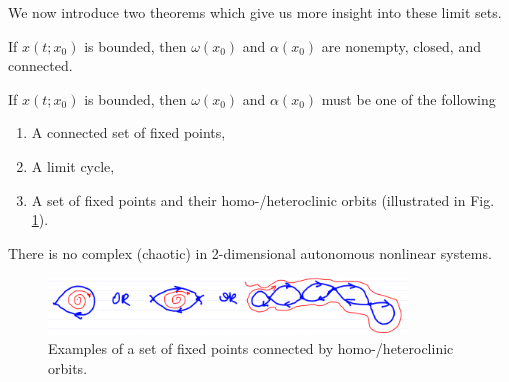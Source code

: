 We now introduce two theorems which give us more insight into these limit sets.
\begin{theorem}[]
	If $x(t;x_0)$ is bounded, then $\omega(x_0)$ and $\alpha(x_0)$ are nonempty, closed, and connected.
\end{theorem}
\begin{theorem}
	If $x(t;x_0)$ is bounded, then $\omega(x_0)$ and $\alpha(x_0)$ must be one of the following 
	\begin{enumerate}
		\item A connected set of fixed points,
		\item A limit cycle,
		\item A set of fixed points and their homo-/heteroclinic orbits (illustrated in Fig. \ref{fig:poincare-bendixon}).
	\end{enumerate}
	There is no complex (chaotic) in 2-dimensional autonomous nonlinear systems. 
	\begin{figure}[h!]
		\centering
		\includegraphics[width=0.85\textwidth]{figures/ch4/8poincare-bendixon.png}
		\caption{Examples of a set of fixed points connected by homo-/heteroclinic orbits.}
		\label{fig:poincare-bendixon}
	\end{figure}	
\end{theorem}
